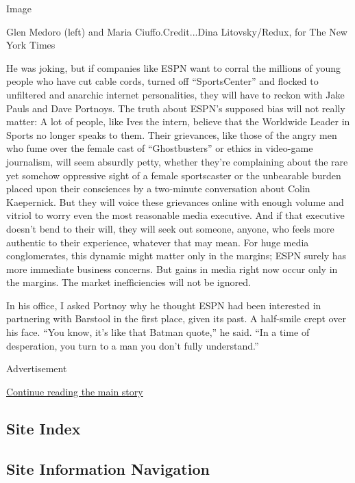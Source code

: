 Image

Glen Medoro (left) and Maria Ciuffo.Credit...Dina Litovsky/Redux, for
The New York Times

He was joking, but if companies like ESPN want to corral the millions of
young people who have cut cable cords, turned off ``SportsCenter'' and
flocked to unfiltered and anarchic internet personalities, they will
have to reckon with Jake Pauls and Dave Portnoys. The truth about ESPN's
supposed bias will not really matter: A lot of people, like Ives the
intern, believe that the Worldwide Leader in Sports no longer speaks to
them. Their grievances, like those of the angry men who fume over the
female cast of ``Ghostbusters'' or ethics in video-game journalism, will
seem absurdly petty, whether they're complaining about the rare yet
somehow oppressive sight of a female sportscaster or the unbearable
burden placed upon their consciences by a two-minute conversation about
Colin Kaepernick. But they will voice these grievances online with
enough volume and vitriol to worry even the most reasonable media
executive. And if that executive doesn't bend to their will, they will
seek out someone, anyone, who feels more authentic to their experience,
whatever that may mean. For huge media conglomerates, this dynamic might
matter only in the margins; ESPN surely has more immediate business
concerns. But gains in media right now occur only in the margins. The
market inefficiencies will not be ignored.

In his office, I asked Portnoy why he thought ESPN had been interested
in partnering with Barstool in the first place, given its past. A
half-smile crept over his face. ``You know, it's like that Batman
quote,'' he said. ``In a time of desperation, you turn to a man you
don't fully understand.''

Advertisement

\protect\hyperlink{after-bottom}{Continue reading the main story}

\hypertarget{site-index}{%
\subsection{Site Index}\label{site-index}}

\hypertarget{site-information-navigation}{%
\subsection{Site Information
Navigation}\label{site-information-navigation}}

